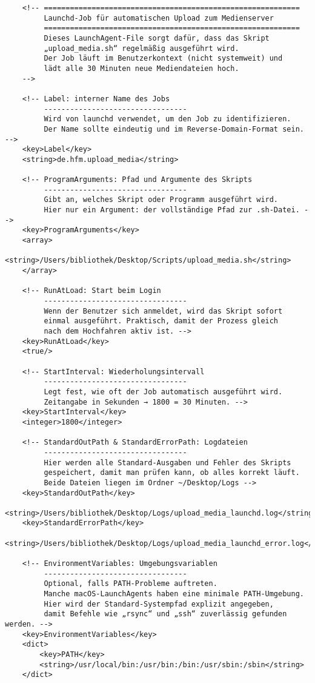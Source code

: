 \documentclass[12pt,a4paper]{report}
\begin{document}
\begin{enumerate}
\begin{verbatim}
    <!-- ===========================================================
         Launchd-Job für automatischen Upload zum Medienserver
         ===========================================================
         Dieses LaunchAgent-File sorgt dafür, dass das Skript
         „upload_media.sh“ regelmäßig ausgeführt wird.
         Der Job läuft im Benutzerkontext (nicht systemweit) und
         lädt alle 30 Minuten neue Mediendateien hoch.
    -->

    <!-- Label: interner Name des Jobs
         ---------------------------------
         Wird von launchd verwendet, um den Job zu identifizieren.
         Der Name sollte eindeutig und im Reverse-Domain-Format sein. -->
    <key>Label</key>
    <string>de.hfm.upload_media</string>

    <!-- ProgramArguments: Pfad und Argumente des Skripts
         ---------------------------------
         Gibt an, welches Skript oder Programm ausgeführt wird.
         Hier nur ein Argument: der vollständige Pfad zur .sh-Datei. -->
    <key>ProgramArguments</key>
    <array>
        <string>/Users/bibliothek/Desktop/Scripts/upload_media.sh</string>
    </array>

    <!-- RunAtLoad: Start beim Login
         ---------------------------------
         Wenn der Benutzer sich anmeldet, wird das Skript sofort
         einmal ausgeführt. Praktisch, damit der Prozess gleich
         nach dem Hochfahren aktiv ist. -->
    <key>RunAtLoad</key>
    <true/>

    <!-- StartInterval: Wiederholungsintervall
         ---------------------------------
         Legt fest, wie oft der Job automatisch ausgeführt wird.
         Zeitangabe in Sekunden → 1800 = 30 Minuten. -->
    <key>StartInterval</key>
    <integer>1800</integer>

    <!-- StandardOutPath & StandardErrorPath: Logdateien
         ---------------------------------
         Hier werden alle Standard-Ausgaben und Fehler des Skripts
         gespeichert, damit man prüfen kann, ob alles korrekt läuft.
         Beide Dateien liegen im Ordner ~/Desktop/Logs -->
    <key>StandardOutPath</key>
    <string>/Users/bibliothek/Desktop/Logs/upload_media_launchd.log</string>
    <key>StandardErrorPath</key>
    <string>/Users/bibliothek/Desktop/Logs/upload_media_launchd_error.log</string>

    <!-- EnvironmentVariables: Umgebungsvariablen
         ---------------------------------
         Optional, falls PATH-Probleme auftreten.
         Manche macOS-LaunchAgents haben eine minimale PATH-Umgebung.
         Hier wird der Standard-Systempfad explizit angegeben,
         damit Befehle wie „rsync“ und „ssh“ zuverlässig gefunden werden. -->
    <key>EnvironmentVariables</key>
    <dict>
        <key>PATH</key>
        <string>/usr/local/bin:/usr/bin:/bin:/usr/sbin:/sbin</string>
    </dict>


\end{verbatim}
\end{enumerate}
\end{document}
